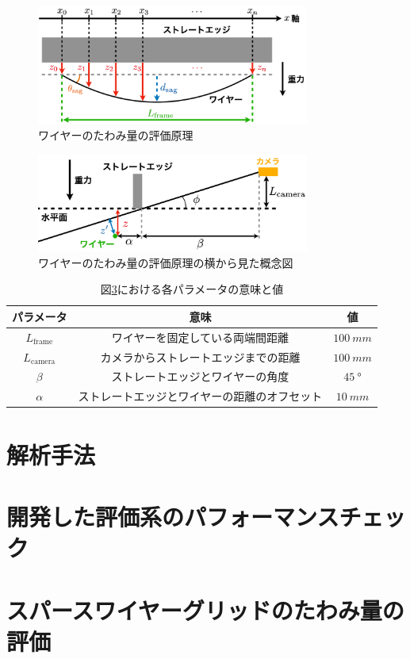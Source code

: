\documentclass[../../main.tex]{subfiles}
\begin{document}
\begin{figure}[H]
    \centering
    \includegraphics[width=0.8\textwidth]{wiresag/wiresag_concept.pdf}
    \caption{ワイヤーのたわみ量の評価原理}
    \label{fig:wiresag_concept}
\end{figure}
\begin{figure}[H]
    \centering
    \includegraphics[width=0.8\textwidth]{wiresag/wiresag_concept_yoko.pdf}
    \caption{ワイヤーのたわみ量の評価原理の横から見た概念図}
    \label{fig:wiresag_concept_yoko}
\end{figure}
\begin{table}
    \centering
    \caption{図\ref{}における各パラメータの意味と値}
    \begin{tabular}{ccc}
        パラメータ & 意味 & 値 \\
        \hline\hline
        $L_{\mathrm{frame}}$ & ワイヤーを固定している両端間距離 & $\SI{100}{mm}$ \\
        $L_{\mathrm{camera}}$ & カメラからストレートエッジまでの距離 & $\SI{100}{mm}$ \\
        $\beta$ & ストレートエッジとワイヤーの角度 & $\SI{45}{\degree}$ \\
        $\alpha$ & ストレートエッジとワイヤーの距離のオフセット & $\SI{10}{mm}$ \\
    \end{tabular}
\end{table}


\section{解析手法}

\section{開発した評価系のパフォーマンスチェック}

\section{スパースワイヤーグリッドのたわみ量の評価}
\end{document}
